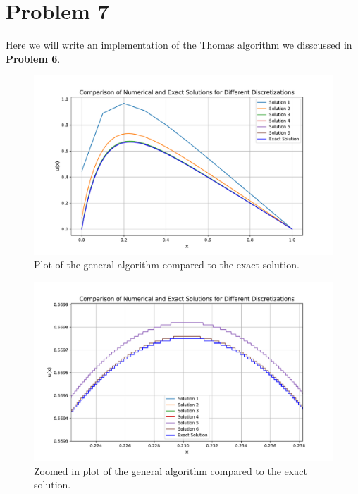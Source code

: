 \documentclass[english,notitlepage]{revtex4-1}  %
\begin{document}
\section*{Problem 7}
Here we will write an implementation of the Thomas algorithm we disscussed in
\textbf{Problem 6}.

\begin{figure}%
    \centering %
    \includegraphics[scale=0.70]{problem7/general_algorithm_plot.pdf} %
    \caption{Plot of the general algorithm compared to the exact solution.} %
    \label{fig:general_algorithm} %
\end{figure}

\begin{figure}%
    \centering %
    \includegraphics[scale=0.70]{problem7/zoom_in_plot.pdf} %
    \caption{Zoomed in plot of the general algorithm compared to the exact solution.} %
    \label{fig:general_algorithm_zoomed} %
\end{figure}
\end{document}
